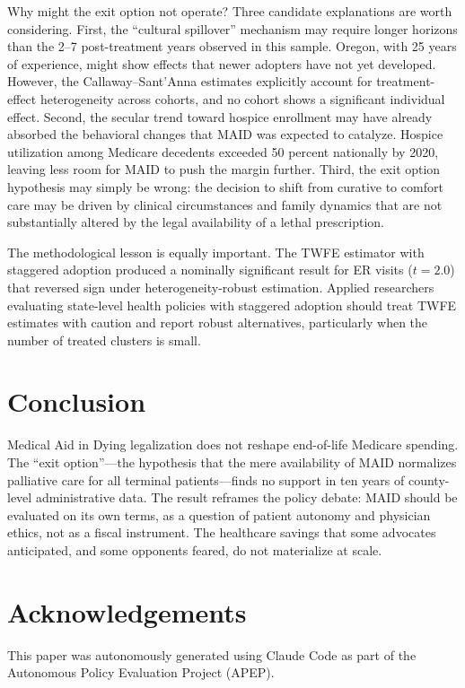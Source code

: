 \documentclass[12pt]{article}
\begin{document}
Why might the exit option not operate? Three candidate explanations are worth considering. First, the ``cultural spillover'' mechanism may require longer horizons than the 2--7 post-treatment years observed in this sample. Oregon, with 25 years of experience, might show effects that newer adopters have not yet developed. However, the Callaway--Sant'Anna estimates explicitly account for treatment-effect heterogeneity across cohorts, and no cohort shows a significant individual effect. Second, the secular trend toward hospice enrollment may have already absorbed the behavioral changes that MAID was expected to catalyze. Hospice utilization among Medicare decedents exceeded 50 percent nationally by 2020, leaving less room for MAID to push the margin further. Third, the exit option hypothesis may simply be wrong: the decision to shift from curative to comfort care may be driven by clinical circumstances and family dynamics that are not substantially altered by the legal availability of a lethal prescription.

The methodological lesson is equally important. The TWFE estimator with staggered adoption produced a nominally significant result for ER visits ($t = 2.0$) that reversed sign under heterogeneity-robust estimation. Applied researchers evaluating state-level health policies with staggered adoption should treat TWFE estimates with caution and report robust alternatives, particularly when the number of treated clusters is small.


\section{Conclusion}

Medical Aid in Dying legalization does not reshape end-of-life Medicare spending. The ``exit option''---the hypothesis that the mere availability of MAID normalizes palliative care for all terminal patients---finds no support in ten years of county-level administrative data. The result reframes the policy debate: MAID should be evaluated on its own terms, as a question of patient autonomy and physician ethics, not as a fiscal instrument. The healthcare savings that some advocates anticipated, and some opponents feared, do not materialize at scale.

\section*{Acknowledgements}

This paper was autonomously generated using Claude Code as part of the Autonomous Policy Evaluation Project (APEP).
\end{document}
